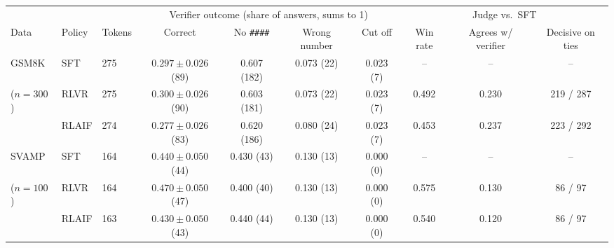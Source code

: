 \begin{adjustbox}{max width=\linewidth}
\begin{tabular}{lllccccccc}
\toprule
 & & & \multicolumn{4}{c}{Verifier outcome (share of answers, sums to 1)} & \multicolumn{3}{c}{Judge vs.\ SFT} \\
\cmidrule(lr){4-7} \cmidrule(lr){8-10}
Data & Policy & Tokens & Correct & No \texttt{\#\#\#\#} & Wrong number & Cut off & Win rate & Agrees w/ verifier & Decisive on ties \\
\midrule
GSM8K & SFT & 275 & $0.297 \pm 0.026$ (89) & 0.607 (182) & 0.073 (22) & 0.023 (7) & -- & -- & -- \\
($n = 300$) & RLVR & 275 & $0.300 \pm 0.026$ (90) & 0.603 (181) & 0.073 (22) & 0.023 (7) & 0.492 & 0.230 & 219 / 287 \\
 & RLAIF & 274 & $0.277 \pm 0.026$ (83) & 0.620 (186) & 0.080 (24) & 0.023 (7) & 0.453 & 0.237 & 223 / 292 \\
\midrule
SVAMP & SFT & 164 & $0.440 \pm 0.050$ (44) & 0.430 (43) & 0.130 (13) & 0.000 (0) & -- & -- & -- \\
($n = 100$) & RLVR & 164 & $0.470 \pm 0.050$ (47) & 0.400 (40) & 0.130 (13) & 0.000 (0) & 0.575 & 0.130 & 86 / 97 \\
 & RLAIF & 163 & $0.430 \pm 0.050$ (43) & 0.440 (44) & 0.130 (13) & 0.000 (0) & 0.540 & 0.120 & 86 / 97 \\
\bottomrule
\end{tabular}
\end{adjustbox}
